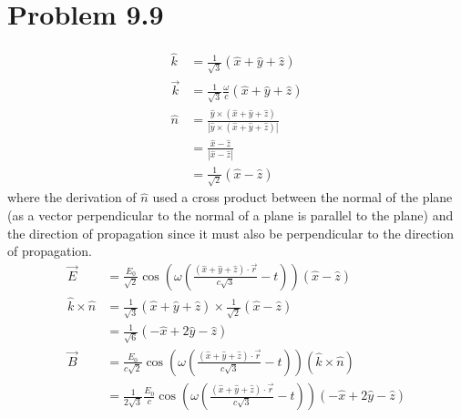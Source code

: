 \documentclass[12pt]{article}
\newcommand{\enterProblemHeader}[1]{
	\rhead{#1}
}
\newenvironment{homeworkProblem}[1]{
    \section{Problem #1}
    \enterProblemHeader{#1}
}{
	\pagebreak
}
\begin{document}
\begin{homeworkProblem}{9.9}
	\begin{align*}
		\hat k &= \frac 1 {\sqrt{3}} \left( \hat x + \hat y + \hat z \right)\\
		\vec k &= \frac 1 {\sqrt{3}} \frac \omega c \left( \hat x + \hat y +
		\hat z \right)\\
		\hat n &= \frac {\hat y \times \left( \hat x + \hat y + \hat z \right)}
		{\left| \hat y \times \left( \hat x + \hat y + \hat z \right) \right|}\\
		&= \frac {\hat x - \hat z} {\left| \hat x - \hat z \right|}\\
		&= \frac 1 {\sqrt{2}} \left( \hat x - \hat z \right)
	\end{align*}
	where the derivation of $\hat n$ used a cross product between the normal of
	the plane (as a vector perpendicular to the normal of a plane is parallel to
	the plane) and the direction of propagation since it must also be
	perpendicular to the direction of propagation.
	\begin{align*}
		\vec E &= \frac {E_0} {\sqrt{2}} \cos \left( \omega \left( \frac {
		\left( \hat x + \hat y + \hat z \right) \cdot \vec r } {c \sqrt{3} } - t
		\right) \right) \left( \hat x - \hat z \right)\\
		\hat k \times \hat n &= \frac 1 {\sqrt{3}} \left( \hat x + \hat y + \hat
		z \right) \times \frac 1 {\sqrt{2}} \left( \hat x - \hat z \right)\\
		&= \frac 1 {\sqrt{6}} \left( - \hat x + 2 \hat y - \hat z \right)\\
		\vec B &= \frac {E_0} {c \sqrt{2}} \cos \left( \omega \left( \frac
		{(\hat x + \hat y + \hat z) \cdot \vec r} {c \sqrt{3}} - t \right)
		\right) ( \hat k \times \hat n)\\
		&= \frac 1 {2 \sqrt{3}} \frac {E_0} c \cos \left( \omega \left( \frac
		{(\hat x + \hat y + \hat z) \cdot \vec r} {c \sqrt{3}} - t \right)
		\right) (- \hat x + 2 \hat y - \hat z)
	\end{align*}

\end{homeworkProblem}
\end{document}
